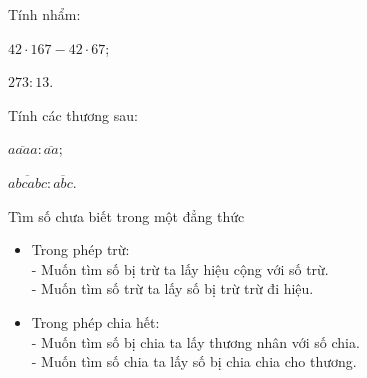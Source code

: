 \begin{vd}%
	Tính nhẩm:
	\begin{enumEX}{2}
		\item $42\cdot 167 - 42\cdot 67$;
		\item $273 : 13$.
	\end{enumEX}
\end{vd}
\begin{vd}%
	Tính các thương sau:
	\begin{enumEX}{2}
		\item $\overline{aaaa} : \overline{aa}$;
		\item $\overline{abcabc} : \overline{abc}$.
	\end{enumEX}
\end{vd}
\begin{dang}{Tìm số chưa biết trong một đẳng thức}
	\begin{itemize}
		\item Trong phép trừ:\\
		 - Muốn tìm số bị trừ ta lấy hiệu cộng với số trừ.\\
		 - Muốn tìm số trừ ta lấy số bị trừ trừ đi hiệu.
		\item Trong phép chia hết:\\
		- Muốn tìm số bị chia ta lấy thương nhân với số chia.\\
		- Muốn tìm số chia ta lấy số bị chia chia cho thương.	
	\end{itemize}
\end{dang}
